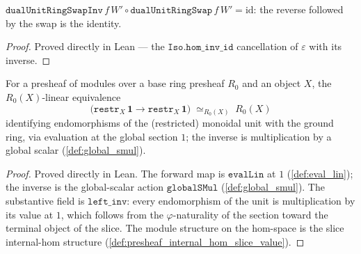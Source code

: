 \begin{lemma}
  \label{lem:dual_unit_ring_swap_inv_comp}
  \(\mathtt{dualUnitRingSwapInv}\,f\,W' \circ \mathtt{dualUnitRingSwap}\,f\,W' =
  \mathrm{id}\): the reverse followed by the swap is the identity.
\end{lemma}
\begin{proof}
  \leanok
  Proved directly in Lean --- the \(\mathtt{Iso.hom\_inv\_id}\) cancellation of
  \(\varepsilon\) with its inverse.
\end{proof}

\begin{definition}
  \label{def:unit_dual_section_equiv}
  For a presheaf of modules over a base ring presheaf \(R_0\) and an object \(X\), the
  \(R_0(X)\)-linear equivalence
  \[
    \bigl(\mathtt{restr}_X\,\mathbf 1 \to \mathtt{restr}_X\,\mathbf 1\bigr)
      \;\simeq_{R_0(X)}\; R_0(X)
  \]
  identifying endomorphisms of the (restricted) monoidal unit with the ground ring, via
  evaluation at the global section \(1\); the inverse is multiplication by a global scalar
  (\cref{def:global_smul}).
\end{definition}
\begin{proof}
  \leanok
  Proved directly in Lean. The forward map is \(\mathtt{evalLin}\) at \(1\)
  (\cref{def:eval_lin}); the inverse is the global-scalar action \(\mathtt{globalSMul}\)
  (\cref{def:global_smul}). The substantive field is \(\mathtt{left\_inv}\): every
  endomorphism of the unit is multiplication by its value at \(1\), which follows from the
  \(\varphi\)-naturality of the section toward the terminal object of the slice. The module
  structure on the hom-space is the slice internal-hom structure
  (\cref{def:presheaf_internal_hom_slice_value}).
\end{proof}

